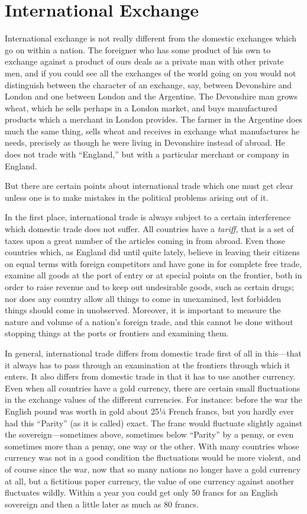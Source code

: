 \documentclass{book}
\begin{document}
\chapter*{International Exchange}
\label{chapter-15}
International exchange is not really different from the domestic exchanges which go on within a nation. The foreigner who has some product of his own to exchange against a product of ours deals as a private man with other private men, and if you could see all the exchanges of the world going on you would not distinguish between the character of an exchange, say, between Devonshire and London and one between London and the Argentine. The Devonshire man grows wheat, which he sells perhaps in a London market, and buys manufactured products which a merchant in London provides. The farmer in the Argentine does much the same thing, sells wheat and receives in exchange what manufactures he needs, precisely as though he were living in Devonshire instead of abroad. He does not trade with “England,” but with a particular merchant or company in England.

But there are certain points about international trade which one must get clear unless one is to make mistakes in the political problems arising out of it.

In the first place, international trade is always subject to a certain interference which domestic trade does not suffer. All countries have a \emph{tariff,} that is a set of taxes upon a great number of the articles coming in from abroad. Even those countries which, as England did until quite lately, believe in leaving their citizens on equal terms with foreign competitors and have gone in for complete free trade, examine all goods at the port of entry or at special points on the frontier, both in order to raise revenue and to keep out undesirable goods, such as certain drugs; nor does any country allow all things to come in unexamined, lest forbidden things should come in unobserved. Moreover, it is important to measure the nature and volume of a nation’s foreign trade, and this cannot be done without stopping things at the ports or frontiers and examining them.

In general, international trade differs from domestic trade first of all in this—that it always has to pass through an examination at the frontiers through which it enters. It also differs from domestic trade in that it has to use another currency. Even when all countries have a gold currency, there are certain small fluctuations in the exchange values of the different currencies. For instance: before the war the English pound was worth in gold about 25¼ French francs, but you hardly ever had this “Parity” (as it is called) exact. The franc would fluctuate slightly against the sovereign—sometimes above, sometimes below “Parity” by a penny, or even sometimes more than a penny, one way or the other. With many countries whose currency was not in a good condition the fluctuations would be more violent, and of course since the war, now that so many nations no longer have a gold currency at all, but a fictitious paper currency, the value of one currency against another fluctuates wildly. Within a year you could get only 50 francs for an English sovereign and then a little later as much as 80 francs.
\end{document}
